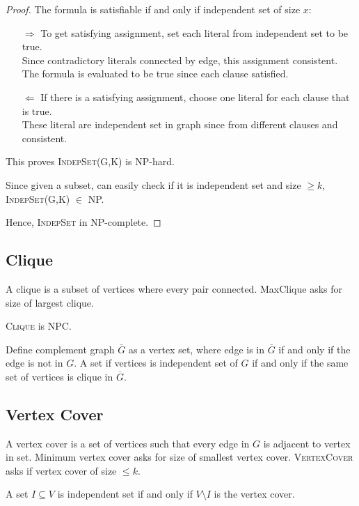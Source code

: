 \begin{proof}
The formula is satisfiable if and only if independent set of size $x$:
\begin{itemize}[leftmargin=.75in]
    \item[$\Longrightarrow$] To get satisfying assignment, set each literal from
        independent set to be true.\\
        Since contradictory literals connected by edge, this assignment consistent.\\
        The formula is evaluated to be true since each clause satisfied.
    \item[$\Longleftarrow$] If there is a satisfying assignment, choose one literal for
        each clause that is true.\\
        These literal are independent set in graph since from different clauses and consistent.
\end{itemize}

This proves \textsc{IndepSet}(G,K) is NP-hard.

Since given a subset, can easily check if it is independent set and size $\geq k$,
\textsc{IndepSet}(G,K) $\in$ NP.

Hence, \textsc{IndepSet} in NP-complete.
\end{proof}

\subsection{Clique}
A clique is a subset of vertices where every pair connected.
MaxClique asks for size of largest clique.

\textsc{Clique} is NPC.

Define complement graph $\overline{G}$ as a vertex set, where edge is in $\overline{G}$ if and only if
the edge is not in $G$.
A set if vertices is independent set of $G$ if and only if the same set of vertices is clique in $\overline{G}$.

\subsection{Vertex Cover}
A vertex cover is a set of vertices such that every edge in $G$ is adjacent to vertex in set.
Minimum vertex cover asks for size of smallest vertex cover.
\textsc{VertexCover} asks if vertex cover of size $\leq k$.

\begin{claim}
    A set $I \subseteq V$ is independent set if and only if $V \setminus I$ is the vertex cover.
\end{claim}

